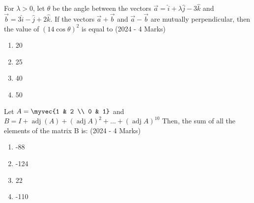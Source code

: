 \iffalse
\title{Assignment 1}
\author{Siddhanth Yellanki - ee24btech11059}
\section{mcq-single}
\fi

   	\item{
    		
    		For $\lambda>0$, let $\theta$ be the angle between the vectors $\vec{a}=\hat{i}+\lambda \hat{j}-3 \hat{k}$ and $\vec{b}=3 \hat{i}-\hat{j}+2 \hat{k}$. If the vectors $\vec{a}+\vec{b}$ and $\vec{a}-\vec{b}$ are mutually perpendicular, then the value of $(14 \cos\theta)^{2}$ is equal to\text{ }
    		\hfill
    		{(2024 - 4 Marks)}
    		\begin{multicols}{4}
    			\begin{enumerate}
    				\item 20
    				\item 25
    				\item 40
    				\item 50
    			\end{enumerate}
    		\end{multicols}
    	}
    \item{
          	Let $A=\myvec{1 & 2 \\ 0 & 1}$ and $B=I+\operatorname{adj}(A)+(\operatorname{adj} A)^{2}+\ldots+(\operatorname{adj} A)^{10}$
          	Then, the sum of all the elements of the matrix B is: \text{  } \hfill
                {(2024 - 4 Marks)}
                \begin{multicols}{4}
					\begin{enumerate}
						\item -88
						\item -124
						\item 22
						\item -110
					\end{enumerate}
				\end{multicols}
            }

